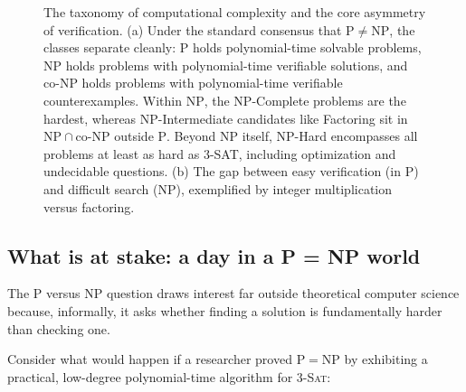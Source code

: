 \begin{figure}[htbp]
\caption{The taxonomy of computational complexity and the core asymmetry of verification. (a) Under the standard consensus that $\mathrm{P} \neq \mathrm{NP}$, the classes separate cleanly: $\mathrm{P}$ holds polynomial-time solvable problems, $\mathrm{NP}$ holds problems with polynomial-time verifiable solutions, and $\mathrm{co\text{-}NP}$ holds problems with polynomial-time verifiable counterexamples. Within $\mathrm{NP}$, the $\mathrm{NP}$-Complete problems are the hardest, whereas $\mathrm{NP}$-Intermediate candidates like Factoring sit in $\mathrm{NP} \cap \mathrm{co\text{-}NP}$ outside $\mathrm{P}$. Beyond $\mathrm{NP}$ itself, $\mathrm{NP}$-Hard encompasses all problems at least as hard as 3-SAT, including optimization and undecidable questions. (b) The gap between easy verification (in $\mathrm{P}$) and difficult search ($\mathrm{NP}$), exemplified by integer multiplication versus factoring.}
\label{ch33:fig-p-vs-np-map}
\end{figure}

\subsection{What is at stake: a day in a P = NP world}

The $\mathrm{P}$ versus $\mathrm{NP}$ question draws interest far outside theoretical computer science because, informally, it asks whether finding a solution is fundamentally harder than checking one.

Consider what would happen if a researcher proved $\mathrm{P} = \mathrm{NP}$ by exhibiting a practical, low-degree polynomial-time algorithm for \textsc{3-Sat}:

